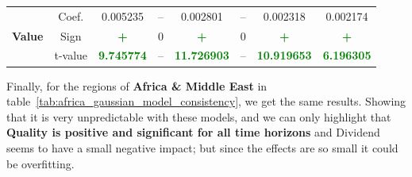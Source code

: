 \documentclass[11pt,english,a4paper,hidelinks]{book}
\begin{document}
\begin{table}[H]
\begin{tabular}{lccccccc}
        \midrule
        \multirow{3}{*}{\textbf{Value}} 
            & Coef. & 0.005235 & -- & 0.002801 & -- & 0.002318 & 0.002174 \\
            & Sign & \textbf{\textcolor{green}{+}} & 0 & \textbf{\textcolor{green}{+}} & 0 & \textbf{\textcolor{green}{+}} & \textbf{\textcolor{green}{+}} \\
            & t-value & \textbf{\textcolor{green}{9.745774}} & -- & \textbf{\textcolor{green}{11.726903}} & -- & \textbf{\textcolor{green}{10.919653}} & \textbf{\textcolor{green}{6.196305}} \\
        \bottomrule
    \end{tabular}
    \label{tab:latam_gaussian_model_consistency}
\end{table}

\noindent Finally, for the regions of \textbf{Africa \& Middle East} in table~\ref{tab:africa_gaussian_model_consistency}, we get the same results. Showing that it is very unpredictable with these models, and we can only highlight that \textbf{Quality is positive and significant for all time horizons} and Dividend seems to have a small negative impact; but since the effects are so small it could be overfitting.
\end{document}
